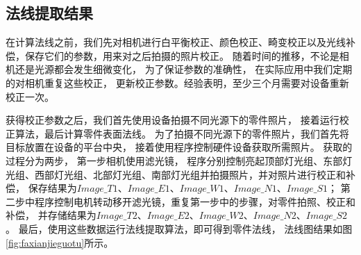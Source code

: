 \subsection{法线提取结果}

在计算法线之前，我们先对相机进行白平衡校正、颜色校正、畸变校正以及光线补偿，保存它们的参数，用来对之后拍摄的照片校正。
随着时间的推移，不论是相机还是光源都会发生细微变化，
为了保证参数的准确性，
在实际应用中我们定期的对相机重复这些校正，
更新校正参数。经验表明，至少三个月需要对设备重新校正一次。

获得校正参数之后，我们首先使用设备拍摄不同光源下的零件照片，
接着运行校正算法，最后计算零件表面法线。
为了拍摄不同光源下的零件照片，我们首先将目标放置在设备的平台中央，
接着使用程序控制硬件设备获取所需照片。
获取的过程分为两步，
第一步相机使用滤光镜，
程序分别控制亮起顶部灯光组、东部灯光组、西部灯光组、北部灯光组、南部灯光组并拍摄照片，并对照片进行校正和补偿，
保存结果为$Image\_T1$、$Image\_E1$、$Image\_W1$、$Image\_N1$、$Image\_S1$；
第二步中程序控制电机转动移开滤光镜，重复第一步中的步骤，对零件拍照、校正和补偿，
并存储结果为$Image\_T2$、$Image\_E2$、$Image\_W2$、$Image\_N2$、$Image\_S2$。
最后，使用这些数据运行法线提取算法，即可得到零件法线，
法线图结果如图\ref{fig:faxianjieguotu}所示。

